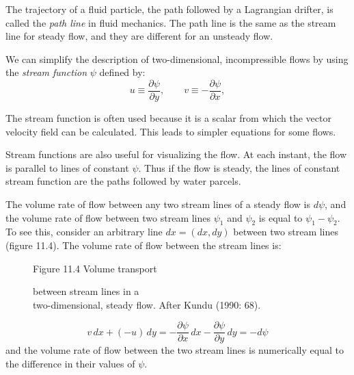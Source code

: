 The trajectory of a fluid particle, the path followed by a Lagrangian
drifter, is called the \textit{path line} in
fluid mechanics. The path line is the same as the stream line for
steady flow, and they are different for an unsteady flow.

We can simplify the description of two-dimensional, incompressible
flows by using the \textit{stream function} $\psi$ defined by:
\begin{equation}
u \equiv \frac{\partial{\psi}}{\partial{y}}, \qquad v \equiv -
\frac{\partial{\psi}}{\partial{x}},
\end{equation}

The stream function is often used because it is a scalar from which
the vector velocity field can be calculated. This leads to simpler
equations for some flows.

Stream functions are also useful for visualizing the flow. At each
instant, the flow is parallel to lines of constant $\psi$. Thus if the
flow is steady, the lines of constant stream function are the paths
followed by water parcels.

The volume rate of flow between any two stream lines of a steady flow
is $d\psi$, and the volume rate of flow between two stream lines $\psi_1$
and $\psi _2$ is equal to $\psi _1 - \psi _2$. To see this,
consider an arbitrary line $dx = (dx, dy)$ between two stream lines
(figure 11.4). The volume rate of flow between the stream lines is:

\begin{figure}[t!]
\centering
\footnotesize
Figure 11.4 Volume transport
\rule{0mm}{3ex}between stream lines in a\\two-dimensional, steady
flow. After Kundu (1990: 68).

\label{fig:volxportsketch}
\vspace{-4ex}
\end{figure}
\begin{equation}
v\,dx+(-u)\,dy=-\frac{\partial{\psi}}{\partial{x}}\,dx-\frac{\partial{\psi}}{\partial{y}}\,dy=-d\psi
\end{equation}
and the volume rate of flow between the two stream lines is
numerically equal to the difference in their values of $\psi$.

